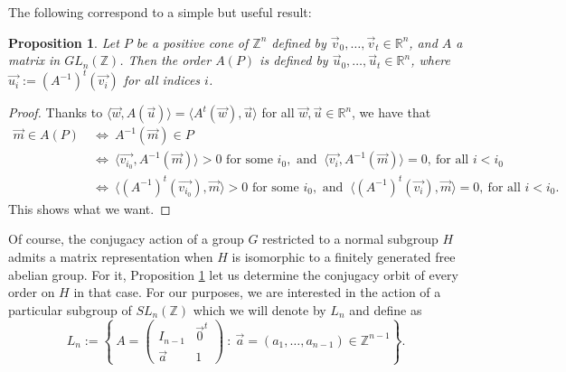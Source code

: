 \documentclass[12pt]{article}
\newtheorem{prop}{Proposition}
\theoremstyle{definition}
\begin{document}
The following correspond to a simple but useful result:

\begin{prop}
\label{vectors}
Let $P$ be a positive cone of $\mathbb{Z}^n$ defined by $\vec{v}_0,\dots,\vec{v}_t\in \mathbb{R}^n$, and $A$ a matrix in $GL_{n}(\mathbb{Z})$. Then the order $A(P)$ is defined by $\vec{u}_0,\dots,\vec{u}_t\in\mathbb{R}^n$, where $\vec{u_i}:=(A^{-1})^t(\vec{v_i})$ for all indices $i$.
\end{prop}

\begin{proof}
Thanks to $\langle\vec{w}, A(\vec{u})\rangle=\langle A^{t}(\vec{w}), \vec{u}\rangle$ for all $\vec{w},\vec{u}\in \mathbb{R}^n$, we have that
\begin{align*}
    \vec{m}\in A(P)\ &\Longleftrightarrow\ A^{-1}(\vec{m})\in P\\
    &\Longleftrightarrow\ \langle\vec{v_{i_{0}}}, A^{-1}(\vec{m})\rangle>0 \text{ for some } i_0, \text{ and }\ \langle\vec{v_i}, A^{-1}(\vec{m})\rangle=0,\ \text{for all } i<i_0\\
    &\Longleftrightarrow\ \langle(A^{-1})^t(\vec{v_{i_{0}}}),\vec{m}\rangle>0 \text{ for some } i_0, \text{ and }\ \langle(A^{-1})^t(\vec{v_i}), \vec{m}\rangle=0,\ \text{for all } i<i_0. 
\end{align*}
This shows what we want.   
\end{proof}

Of course, the conjugacy action of a group $G$ restricted to a normal subgroup $H$ admits a matrix representation when $H$ is isomorphic to a finitely generated free abelian group. For it, Proposition \ref{vectors} let us determine the conjugacy orbit of every order on $H$ in that case. 
For our purposes, we are interested in the action of a particular subgroup of $SL_n(\mathbb{Z})$ which we will denote by $L_n$ and define as
$$L_n:=\left \{\ A=\left (
\begin{array}{cc}
    I_{n-1} & \vec{0}^t\\
    \vec{a} & 1
\end{array}
\right )\  :\ \vec{a}=(a_1,\dots,a_{n-1})\in \mathbb{Z}^{n-1} 
\right \}.$$
\end{document}
